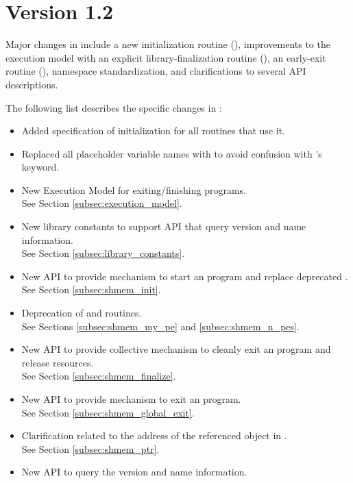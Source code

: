 \section{Version 1.2}
Major changes in \openshmem[1.2] include
a new initialization routine (),
improvements to the execution model with an explicit
library-finalization routine (),
an early-exit routine (),
namespace standardization,
and clarifications to several API descriptions.

The following list describes the specific changes in \openshmem[1.2]:
\begin{itemize}
%
\item Added specification of  initialization for all routines that use it.
%
\item Replaced all placeholder variable names  with  to
      avoid confusion with \Fortran's  keyword.
%
\item New Execution Model for exiting/finishing \openshmem programs.
\\See Section  \ref{subsec:execution_model}.
%
\item New library constants to support API that query version and name information.
\\See Section \ref{subsec:library_constants}.
%
\item New API  to provide mechanism to start an \openshmem
      program and replace deprecated .
\\See Section \ref{subsec:shmem_init}.
%
\item Deprecation of  and  routines.
\\See Sections \ref{subsec:shmem_my_pe} and \ref{subsec:shmem_n_pes}.
%
\item New API  to provide collective mechanism to cleanly
      exit an \openshmem program and release resources.
\\See Section \ref{subsec:shmem_finalize}.
%
\item New API  to provide mechanism to exit an
    \openshmem program.
\\See Section \ref{subsec:shmem_global_exit}.
%
\item Clarification related to the address of the referenced object in
    .
\\See Section \ref{subsec:shmem_ptr}.
%
\item New API to query the version and name information.

\end{itemize}
